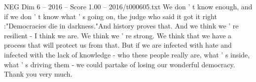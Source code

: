 \begin{textsample}{NEG Dim 6 – 2016 – Score 1.00 – 2016/t000605.txt}
We don ' t know enough, and if we don ' t know what ' s going on, the judge who said it got it right :"Democracies die in darkness."And history proves that.
And we think we ' re resilient - I think we are.
We think we ' re strong.
We think that we have a process that will protect us from that.
But if we are infected with hate and infected with the lack of knowledge - who these people really are, what ' s inside, what ' s driving them - we could partake of losing our wonderful democracy.
Thank you very much.

\end{textsample}
